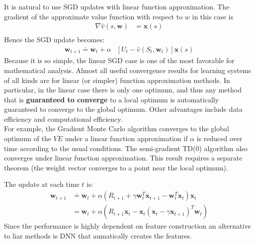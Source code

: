 It is natural to use SGD updates with linear function approximation. The gradient of the approximate value function with respect to $w$ in this case is
\begin{align}
    \nabla\hat{v}(s,\mathbf{w})&=\mathbf{x}(s)\\
\end{align}
Hence the SGD update becomes:
\begin{align}
    \mathbf{w}_{t+1}\doteq\mathbf{w}_{t}+\alpha&[U_t-\hat{v}(S_t, \mathbf{w}_{t})]\mathbf{x}(s)
\end{align}
Because it is so simple, the linear SGD case is one of the most favorable for mathematical analysis. Almost all useful convergence results for learning systems of all kinds are for linear (or simpler) function approximation methods.
In particular, in the linear case there is only one optimum, and thus any method that is \textbf{guaranteed to converge} to a local optimum is automatically guaranteed to converge to the global optimum. Other advantages include data efficiency and computational efficiency.\\

For example, the Gradient Monte Carlo algorithm converges to the global optimum of the $\overline{VE}$ under a linear function approximation if $\alpha$ is reduced over time according to the usual conditions. The semi-gradient TD(0) algorithm also converges under linear function approximation. This result requires a separate theorem (the weight vector converges to a point near the local optimum).

The update at each time $t$ is:
\begin{align}
    \mathbf{w}_{t+1}&\doteq\mathbf{w}_t+\alpha\left(R_{t+1}+\gamma\mathbf{w}_t^T\mathbf{x}_{t+1}-\mathbf{w}_t^T\mathbf{x}_t\right)\mathbf{x}_t\\
    &=\mathbf{w}_t+\alpha\left(R_{t+1}\mathbf{x}_t-\mathbf{x}_t(\mathbf{x}_t-\gamma\mathbf{x}_{t+1})^T\mathbf{w}_t\right)
\end{align}
Since the performance is highly dependent on feature construction an alternative to liar methods is DNN that aumatically creates the features.